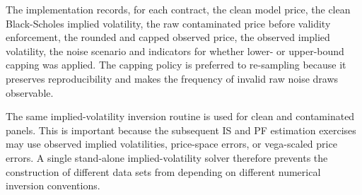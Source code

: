 \documentclass[11pt,a4paper,notitlepage]{article}
\numberwithin{equation}{section}
\begin{document}
The implementation records, for each contract, the clean model price, the clean Black-Scholes implied volatility,
the raw contaminated price before validity enforcement, the rounded and capped observed price, the observed implied
volatility, the noise scenario and indicators for whether lower- or upper-bound capping was applied. The capping
policy is preferred to re-sampling because it preserves reproducibility and makes the frequency of invalid raw
noise draws observable.

The same implied-volatility inversion routine is used for clean and contaminated panels. This is important because
the subsequent IS and PF estimation exercises may use observed implied volatilities, price-space errors, or
vega-scaled price errors. A single stand-alone implied-volatility solver therefore prevents the construction of
different data sets from depending on different numerical inversion conventions.

\newpage


\nocite{*}

\end{document}
